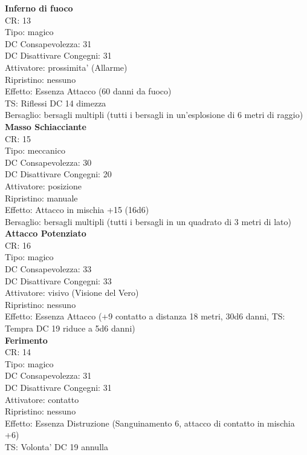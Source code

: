 \documentclass[a4paper,11pt,twoside,openany]{book}
\begin{document}
\begin{multicols}{2}
\textbf{Inferno di fuoco}\\
CR: 13 \\
Tipo: magico \\
DC Consapevolezza: 31 \\
DC Disattivare Congegni: 31 \\
Attivatore: prossimita' (Allarme) \\
Ripristino: nessuno \\
Effetto: Essenza Attacco (60 danni da fuoco) \\
TS: Riflessi DC 14 dimezza \\
Bersaglio: bersagli multipli (tutti i bersagli in un’esplosione di 6 metri di raggio)\\

\textbf{Masso Schiacciante}\\
CR: 15 \\
Tipo: meccanico \\
DC Consapevolezza: 30 \\
DC Disattivare Congegni: 20 \\
Attivatore: posizione \\
Ripristino: manuale \\
Effetto: Attacco in mischia +15 (16d6) \\
Bersaglio: bersagli multipli (tutti i bersagli in un quadrato di 3 metri di lato)\\

\textbf{Attacco Potenziato}\\
CR: 16 \\
Tipo: magico \\
DC Consapevolezza: 33 \\
DC Disattivare Congegni: 33 \\
Attivatore: visivo (Visione del Vero) \\
Ripristino: nessuno \\
Effetto: Essenza Attacco (+9 contatto a distanza 18 metri, 30d6 danni, TS: Tempra DC 19 riduce a 5d6 danni)\\

\textbf{Ferimento}\\
CR: 14 \\
Tipo: magico \\
DC Consapevolezza: 31 \\
DC Disattivare Congegni: 31 \\
Attivatore: contatto \\
Ripristino: nessuno \\
Effetto: Essenza Distruzione (Sanguinamento 6, attacco di contatto in mischia +6)\\
TS: Volonta' DC 19 annulla\\


\end{multicols}
\end{document}
